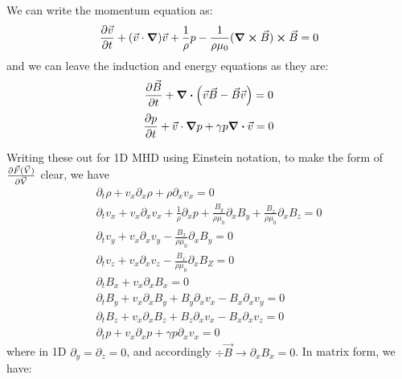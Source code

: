 \documentclass[%
 reprint,
 amsmath,amssymb,
 aps,
]{revtex4-2}
\begin{document}
We can write the momentum equation as:
\begin{equation}
\pdv{\vec v}{t} + (\vec v \cdot \grad) \vec v + \frac{1}{\rho} p - \frac{1}{\rho \mu_0} (\curl \vec B) \cross \vec B = 0
\end{equation}
and we can leave the induction and energy equations as they are:
\begin{equation}
\pdv{\vec B}{t} + \div \left( \vec v \vec B - \vec B \vec v \right) = 0
\end{equation}
\begin{equation}
\pdv{p}{t} + \vec v \cdot \grad p + \gamma p \div \vec v = 0
\end{equation}

Writing these out for 1D MHD using Einstein notation, to make the form of $\pdv{\vec F(\vec V)}{\vec V}$ clear, we have
\begin{eqnarray*}
\partial _t \rho + v_x \partial_x \rho + \rho \partial_x v_x = 0 \\
\partial_t v_x + v_x \partial _x v_x + \frac{1}{\rho} \partial_x p + \frac{B_y}{\rho \mu_0} \partial_x B_y + \frac{B_z}{\rho \mu_0} \partial_x B_z = 0 \\
\partial _t v_y + v_x \partial_x v_y - \frac{B_x}{\rho \mu_0} \partial_x B_y = 0 \\
\partial_t v_z + v_x \partial_x v_z - \frac{B_x}{\rho \mu_0} \partial_x B_Z = 0 \\
\partial_t B_x + v_x \partial_x B_x = 0 \\
\partial_t B_y + v_x \partial_x B_y + B_y \partial_x v_x - B_x \partial_x v_y = 0 \\
\partial_t B_z + v_x \partial_x B_z + B_z \partial_x v_x - B_x \partial_x v_z = 0 \\
\partial_t p + v_x \partial_x p + \gamma p \partial_x v_x = 0
\end{eqnarray*}
where in 1D $\partial_y = \partial_z = 0$, and accordingly $\div \vec B \rightarrow \partial_x B_x = 0$. In matrix form, we have:
\end{document}
